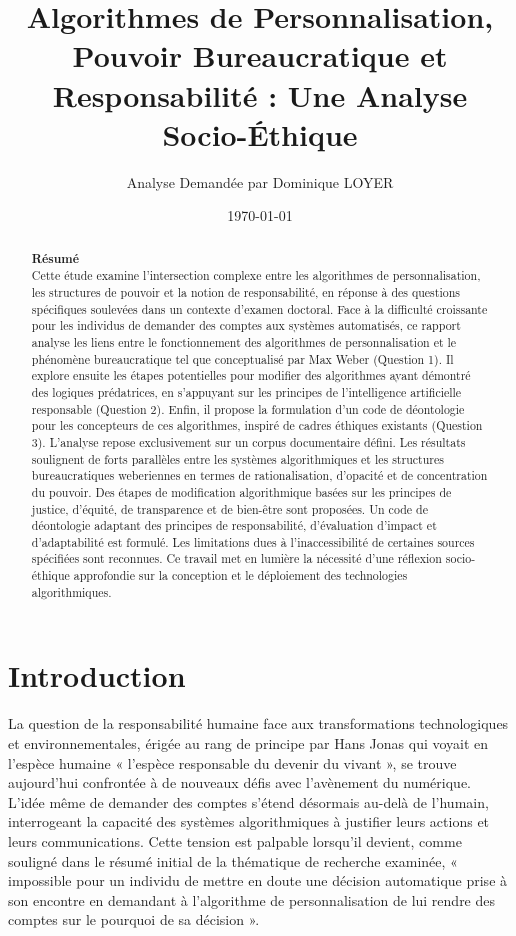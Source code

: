 \documentclass[10pt, twocolumn]{article}
\title{Algorithmes de Personnalisation, Pouvoir Bureaucratique et Responsabilité : Une Analyse Socio-Éthique}
\author{Analyse Demandée par Dominique LOYER}
\date{\today}
\begin{document}
\maketitle

\begin{abstract}
\noindent \textbf{Résumé} \\
Cette étude examine l'intersection complexe entre les algorithmes de personnalisation, les structures de pouvoir et la notion de responsabilité, en réponse à des questions spécifiques soulevées dans un contexte d'examen doctoral. Face à la difficulté croissante pour les individus de demander des comptes aux systèmes automatisés, ce rapport analyse les liens entre le fonctionnement des algorithmes de personnalisation et le phénomène bureaucratique tel que conceptualisé par Max Weber (Question 1). Il explore ensuite les étapes potentielles pour modifier des algorithmes ayant démontré des logiques prédatrices, en s'appuyant sur les principes de l'intelligence artificielle responsable (Question 2). Enfin, il propose la formulation d'un code de déontologie pour les concepteurs de ces algorithmes, inspiré de cadres éthiques existants (Question 3). L'analyse repose exclusivement sur un corpus documentaire défini. Les résultats soulignent de forts parallèles entre les systèmes algorithmiques et les structures bureaucratiques weberiennes en termes de rationalisation, d'opacité et de concentration du pouvoir. Des étapes de modification algorithmique basées sur les principes de justice, d'équité, de transparence et de bien-être sont proposées. Un code de déontologie adaptant des principes de responsabilité, d'évaluation d'impact et d'adaptabilité est formulé. Les limitations dues à l'inaccessibilité de certaines sources spécifiées sont reconnues. Ce travail met en lumière la nécessité d'une réflexion socio-éthique approfondie sur la conception et le déploiement des technologies algorithmiques.
\end{abstract}

\section{Introduction}

La question de la responsabilité humaine face aux transformations technologiques et environnementales, érigée au rang de principe par Hans Jonas qui voyait en l'espèce humaine « l’espèce responsable du devenir du vivant », se trouve aujourd'hui confrontée à de nouveaux défis avec l'avènement du numérique. L'idée même de demander des comptes s'étend désormais au-delà de l'humain, interrogeant la capacité des systèmes algorithmiques à justifier leurs actions et leurs communications. Cette tension est palpable lorsqu'il devient, comme souligné dans le résumé initial de la thématique de recherche examinée, « impossible pour un individu de mettre en doute une décision automatique prise à son encontre en demandant à l’algorithme de personnalisation de lui rendre des comptes sur le pourquoi de sa décision ».
\end{document}
